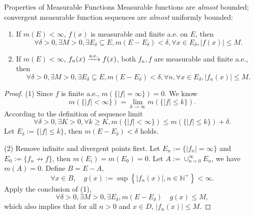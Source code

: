 \begin{example}{Properties of Measurable Functions}{}
  Measurable functions are \emph{almost} bounded;
  convergent measurable function sequences are \emph{almost} uniformly bounded:
  \begin{enumerate}
  \item If $m(E) < \infty$, $f(x)$ is measurable and finite a.e. on $E$, then
    \begin{equation}
      \forall \delta > 0, \exists M > 0, \exists E_{\delta} \subseteq E, m(E - E_{\delta}) < \delta,
      \forall x \in E_{\delta}, |f(x)| \leq M.
    \end{equation}
  \item If $m(E) < \infty$, $f_n(x) \xrightarrow{\text{a.e.}} f(x)$, both $f_n, f$ are measurable
    and finite a.e., then
    \begin{equation}
      \forall \delta > 0, \exists M > 0, \exists E_{\delta} \subseteq E, m(E - E_{\delta}) < \delta,
      \forall n, \forall x \in E_{\delta}, |f_n(x)| \leq M.
    \end{equation}
  \end{enumerate}
\end{example}

\begin{proof}
  (1) Since $f$ is finite a.e., $m(\{|f| = \infty\}) = 0$. We know
  \begin{equation}
    m(\{|f| < \infty\})
    = \lim \limits _{k \rightarrow \infty} m(\{|f| \leq k\}).
  \end{equation}
  According to the definition of sequence limit
  \begin{equation}
    \forall \delta > 0, \exists K > 0, \forall k \geq K,
    m(\{|f| < \infty\}) \leq m(\{|f| \leq k\}) + \delta.
  \end{equation}
  Let $E_{\delta} := \{|f| \leq k\}$, then $m(E - E_{\delta}) < \delta$ holds.

  (2) Remove infinite and divergent points first.
  Let $E_n := \{|f_n| = \infty\}$ and $E_0 := \{f_n \not \rightarrow f\}$,
  then $m(E_i) = m(E_0) = 0$.
  Let $A := \cup _{n = 0}^{\infty} E_n$, we have $m(A) = 0$.
  Define $B = E - A$,
  \begin{equation}
    \forall x \in B, \quad g(x) := \sup \left\{ |f_n(x)| , n \in \mathbb{N}^+\right\} < \infty.
  \end{equation}
  Apply the conclusion of (1),
  \begin{equation}
    \forall \delta > 0, \exists M > 0, \exists E_{\delta}, m(E - E_{\delta})
    \quad g(x) \leq M,
  \end{equation}
  which also implies that for all $n > 0$ and $x \in D$, $|f_n(x)| \leq M$.
\end{proof}

